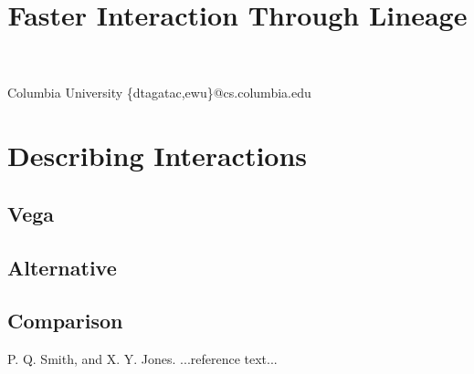 \documentclass{sigplanconf}
\begin{document}
\setlength{\pdfpageheight}{\paperheight}
\setlength{\pdfpagewidth}{\paperwidth}


\title{Faster Interaction Through Lineage}

           {Columbia University}
           {\{dtagatac,ewu\}@cs.columbia.edu}

\maketitle



\section{Describing Interactions}
\subsection{Vega}

\subsection{Alternative}
\subsection{Comparison}


\begin{thebibliography}{}
\softraggedright
{}
P. Q. Smith, and X. Y. Jones. ...reference text...
\end{thebibliography}
\end{document}
